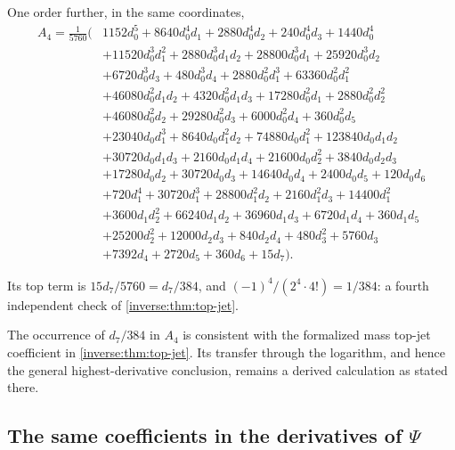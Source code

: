 \documentclass[11pt,oneside]{article}
\theoremstyle{definition}
\theoremstyle{remark}
\begin{document}
One order further, in the same coordinates,
\begin{equation}\label{smallarg:eq:A4jets}
\begin{aligned}
  A_4=\frac{1}{5760}\bigl(&1152d_0^5+8640d_0^4d_1+2880d_0^4d_2+240d_0^4d_3+1440d_0^4\\
   &+11520d_0^3d_1^2+2880d_0^3d_1d_2+28800d_0^3d_1+25920d_0^3d_2\\
   &+6720d_0^3d_3+480d_0^3d_4+2880d_0^2d_1^3+63360d_0^2d_1^2\\
   &+46080d_0^2d_1d_2+4320d_0^2d_1d_3+17280d_0^2d_1+2880d_0^2d_2^2\\
   &+46080d_0^2d_2+29280d_0^2d_3+6000d_0^2d_4+360d_0^2d_5\\
   &+23040d_0d_1^3+8640d_0d_1^2d_2+74880d_0d_1^2+123840d_0d_1d_2\\
   &+30720d_0d_1d_3+2160d_0d_1d_4+21600d_0d_2^2+3840d_0d_2d_3\\
   &+17280d_0d_2+30720d_0d_3+14640d_0d_4+2400d_0d_5+120d_0d_6\\
   &+720d_1^4+30720d_1^3+28800d_1^2d_2+2160d_1^2d_3+14400d_1^2\\
   &+3600d_1d_2^2+66240d_1d_2+36960d_1d_3+6720d_1d_4+360d_1d_5\\
   &+25200d_2^2+12000d_2d_3+840d_2d_4+480d_3^2+5760d_3\\
   &+7392d_4+2720d_5+360d_6+15d_7\bigr).
\end{aligned}
\end{equation}

Its top term is $15d_7/5760=d_7/384$, and $(-1)^4/(2^4\cdot4!)=1/384$: a
fourth independent check of \cref{inverse:thm:top-jet}.


The occurrence of \(d_7/384\) in \(A_4\) is consistent with the formalized mass top-jet
coefficient in \cref{inverse:thm:top-jet}.  Its transfer through the logarithm, and hence the
general highest-derivative conclusion, remains a derived calculation as stated there.

\subsection{The same coefficients in the derivatives of \texorpdfstring{$\Psi$}{Psi}}
\end{document}
